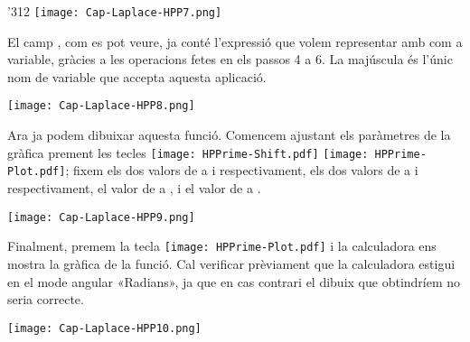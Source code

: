 \begin{exemple}
\begin{dingautolist}{'312}
            \texttt{[image: Cap-Laplace-HPP7.png]}\vspace{5mm}

          \item El camp  , com es pot veure, ja conté l'expressió que volem representar amb   com a variable, gràcies a les operacions fetes en els passos 4 a 6. La  majúscula és l'únic nom de variable que accepta aquesta aplicació.

            \texttt{[image: Cap-Laplace-HPP8.png]}\vspace{5mm}

          \item Ara ja podem dibuixar aquesta funció. Comencem ajustant els paràmetres de la gràfica prement les tecles \texttt{[image: HPPrime-Shift.pdf]} \texttt{[image: HPPrime-Plot.pdf]}; fixem els dos valors de  a  i  respectivament, els dos valors de  a  i  respectivament, el valor de  a , i el valor de  a .

            \texttt{[image: Cap-Laplace-HPP9.png]}\vspace{5mm}

          \item Finalment, premem la tecla \texttt{[image: HPPrime-Plot.pdf]} i la calculadora ens mostra la gràfica de la funció. Cal verificar prèviament que la calculadora estigui en el mode angular «Radians», ja que en cas contrari el dibuix que obtindríem no seria correcte.

            \texttt{[image: Cap-Laplace-HPP10.png]}

    \end{dingautolist}

\end{exemple}
